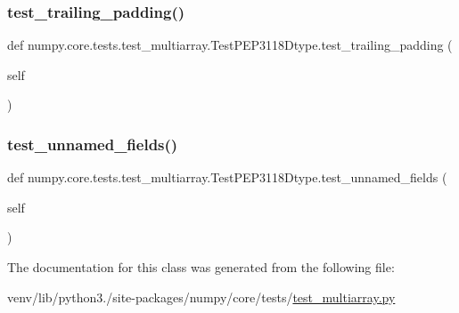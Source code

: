 \subsubsection{\texorpdfstring{test\+\_\+trailing\+\_\+padding()}{test\_trailing\_padding()}}
{\footnotesize\ttfamily def numpy.\+core.\+tests.\+test\+\_\+multiarray.\+Test\+P\+E\+P3118\+Dtype.\+test\+\_\+trailing\+\_\+padding (\begin{DoxyParamCaption}\item[{}]{self }\end{DoxyParamCaption})}

\mbox{\label{classnumpy_1_1core_1_1tests_1_1test__multiarray_1_1TestPEP3118Dtype_a424fbca4dd00701238c9013d2c44c417}} 
\subsubsection{\texorpdfstring{test\+\_\+unnamed\+\_\+fields()}{test\_unnamed\_fields()}}
{\footnotesize\ttfamily def numpy.\+core.\+tests.\+test\+\_\+multiarray.\+Test\+P\+E\+P3118\+Dtype.\+test\+\_\+unnamed\+\_\+fields (\begin{DoxyParamCaption}\item[{}]{self }\end{DoxyParamCaption})}



The documentation for this class was generated from the following file\+:\begin{DoxyCompactItemize}
\item 
venv/lib/python3./site-\/packages/numpy/core/tests/\hyperlink{core_2tests_2test__multiarray_8py}{test\+\_\+multiarray.\+py}\end{DoxyCompactItemize}
